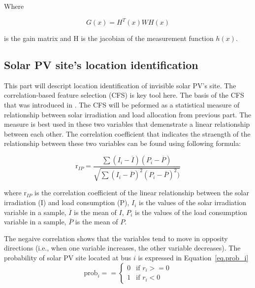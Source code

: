 Where

\begin{equation}
  G(x)=H^{T}(x)WH(x)
\label{eq.gain}
\end{equation}

is the gain matrix and H is the jacobian of the measurement function $h(x)$.

\subsection{Solar PV site's location identification}




This part will descript location identification of invisible solar PV's site.
The correlation-based feature selection (CFS) is key tool here.
The basis of the CFS that was introduced in \cite{b27}.
The CFS will be peformed as a statistical measure of relationship between solar irradiation and load allocation from previous part.
The measure is best used in these two variables that demenstrate a linear relationship between each other.
The correlation coefficient that indicates the straength of the relationship between these two variables can be found using following formula:

\begin{equation}
  \text{r}_{IP} =\frac{\sum(I_{i}-\overline{I})(P_{i}-\overline{P})}{\sqrt{\sum(I_{i}-\overline{P})^{2}(P_{i}-\overline{P})^{2})}}
\label{eq.corr}
\end{equation}

where $\text{r}_{IP}$ is the correlation coefficient of the linear relationship between the solar irradiation (I) and load consumption (P),
$I_{i}$ is the values of the solar irradiation variable in a sample, $\overline{I}$ is the mean of $I$,
$P_{i}$ is the values of the load consumption variable in a sample, $\overline{P}$ is the mean of $P$.

The negaive correlation shows that the variables tend to move in opposity directions (i.e., when one variable increases, the other variable decreases).
The probability of solar PV site located at bus $i$ is expressed in Equation~\ref{eq.prob_i}
\begin{equation}
  \text{prob}_{i}= =
  \begin{cases}
    0 & \text{if  $r_{i}>=0$} \\
    1 & \text{if  $r_{i}<0$}
  \end{cases}
\label{eq.prob_i}
\end{equation}

